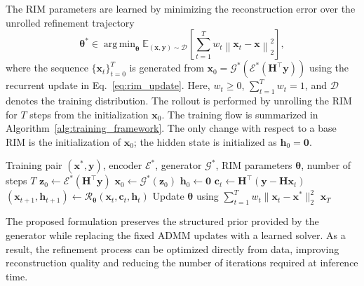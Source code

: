 \documentclass[conference]{IEEEtran}
\DeclareMathOperator*{\argmin}{arg\,min}
\begin{document}
The RIM parameters are learned by minimizing the reconstruction error over the unrolled refinement trajectory
\begin{equation}
    \boldsymbol{\theta}^{\ast}
    \in
    \argmin_{\boldsymbol{\theta}}
    \mathbb{E}_{(\mathbf{x},\mathbf{y})\sim \mathcal{D}}
    \left[
    \sum_{t=1}^{T}
    w_t
    \left\|
        \mathbf{x}_t - \mathbf{x}
    \right\|_2^2
    \right],
    \label{eq:rim_training_objective}
\end{equation}
where the sequence $\{\mathbf{x}_t\}_{t=0}^{T}$ is generated from 
$\mathbf{x}_0=\mathcal{G}^{\ast}(\mathcal{E}^{\ast}(\mathbf{H}^{\top}\mathbf{y}))$ using the recurrent update in Eq.~\eqref{eq:rim_update}. Here, $w_t \geq 0$, $\sum_{t=1}^{T}w_t=1$, and $\mathcal{D}$ denotes the training distribution. The rollout is performed by unrolling the RIM for $T$ steps from the initialization $\mathbf{x}_0$. The training flow is summarized in Algorithm~\ref{alg:training_framework}. The only change with respect to a base RIM is the initialization of $\mathbf{x}_0$; the hidden state is initialized as $\mathbf{h}_0=\mathbf{0}$.

\begin{algorithm}[t]
\caption{Training procedure for PRIM}
\label{alg:training_framework}
\small
\begin{algorithmic}[1]
\Require Training pair $(\mathbf{x}^{\ast},\mathbf{y})$, encoder $\mathcal{E}^{\ast}$, generator $\mathcal{G}^{\ast}$, RIM parameters $\boldsymbol{\theta}$, number of steps $T$
\State $\mathbf{z}_0 \gets \mathcal{E}^{\ast}(\mathbf{H}^{\top}\mathbf{y})$
\State $\mathbf{x}_0 \gets \mathcal{G}^{\ast}(\mathbf{z}_0)$
\State $\mathbf{h}_0 \gets \mathbf{0}$
    \State $\mathbf{c}_t \gets \mathbf{H}^{\top}(\mathbf{y}-\mathbf{H}\mathbf{x}_t)$
    \State $(\mathbf{x}_{t+1},\mathbf{h}_{t+1}) \gets \mathcal{R}_{\boldsymbol{\theta}}(\mathbf{x}_t,\mathbf{c}_t,\mathbf{h}_t)$
\EndFor
\State Update $\boldsymbol{\theta}$ using $\sum_{t=1}^{T} w_t \|\mathbf{x}_t-\mathbf{x}^{\ast}\|_2^2$
\State \Return $\mathbf{x}_T$
\end{algorithmic}
\end{algorithm}

The proposed formulation preserves the structured prior provided by the generator while replacing the fixed ADMM updates with a learned solver. As a result, the refinement process can be optimized directly from data, improving reconstruction quality and reducing the number of iterations required at inference time.
\end{document}
